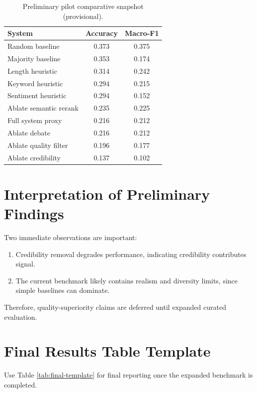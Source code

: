 \documentclass[12pt,a4paper,oneside]{report}
\begin{document}
\begin{table}[htbp]
\centering
\caption{Preliminary pilot comparative snapshot (provisional).}
\label{tab:prelim}
\begin{tabular}{lcc}
\toprule
\textbf{System} & \textbf{Accuracy} & \textbf{Macro-F1} \\
\midrule
Random baseline & 0.373 & 0.375 \\
Majority baseline & 0.353 & 0.174 \\
Length heuristic & 0.314 & 0.242 \\
Keyword heuristic & 0.294 & 0.215 \\
Sentiment heuristic & 0.294 & 0.152 \\
Ablate semantic rerank & 0.235 & 0.225 \\
Full system proxy & 0.216 & 0.212 \\
Ablate debate & 0.216 & 0.212 \\
Ablate quality filter & 0.196 & 0.177 \\
Ablate credibility & 0.137 & 0.102 \\
\bottomrule
\end{tabular}
\end{table}

\section{Interpretation of Preliminary Findings}
Two immediate observations are important:
\begin{enumerate}
  \item Credibility removal degrades performance, indicating credibility contributes signal.
  \item The current benchmark likely contains realism and diversity limits, since simple baselines can dominate.
\end{enumerate}
Therefore, quality-superiority claims are deferred until expanded curated evaluation.

\section{Final Results Table Template}
Use Table \ref{tab:final-template} for final reporting once the expanded benchmark is completed.
\end{document}
